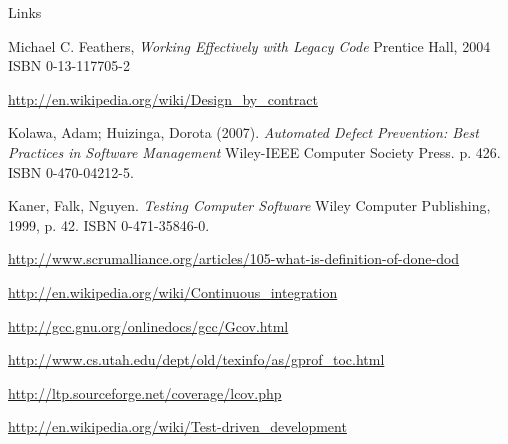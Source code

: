 \documentclass{beamer}
\begin{document}

\begin{frame}{Links}




\tiny
\begin{thebibliography}{100}

Michael C. Feathers, \emph{Working Effectively with Legacy Code} Prentice Hall, 2004 ISBN 0-13-117705-2

\url{http://en.wikipedia.org/wiki/Design_by_contract}

Kolawa, Adam; Huizinga, Dorota (2007). \emph{Automated Defect Prevention: Best Practices in Software Management} Wiley-IEEE Computer Society Press. p. 426. ISBN 0-470-04212-5.

Kaner, Falk, Nguyen. \emph{Testing Computer Software} Wiley Computer Publishing, 1999, p. 42. ISBN 0-471-35846-0.

\url{http://www.scrumalliance.org/articles/105-what-is-definition-of-done-dod}

\url{http://en.wikipedia.org/wiki/Continuous_integration}

\url{http://gcc.gnu.org/onlinedocs/gcc/Gcov.html}

\url{http://www.cs.utah.edu/dept/old/texinfo/as/gprof_toc.html}

\url{http://ltp.sourceforge.net/coverage/lcov.php}

\url{http://en.wikipedia.org/wiki/Test-driven_development}

\end{thebibliography}
\end{frame}


\end{document}
